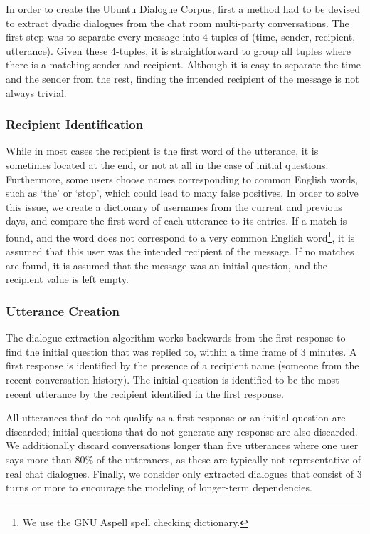 \documentclass[11pt,a4paper]{article}
\begin{document}
In order to create the Ubuntu Dialogue Corpus, first a method had to be devised to extract dyadic dialogues from the chat room multi-party conversations. The first step was to separate every message into 4-tuples of (time, sender, recipient, utterance). Given these 4-tuples, it is straightforward to group all tuples where there is a matching sender and recipient. Although it is easy to separate the time and the sender from the rest, finding the intended recipient of the message is not always trivial.


\subsubsection{Recipient Identification}

While in most cases the recipient is the first word of the utterance, it is sometimes located at the end, or not at all in the case of initial questions. Furthermore, some users choose names corresponding to common English words, such as `the' or `stop', which could lead to many false positives. In order to solve this issue, we create a dictionary of usernames from the current and previous days, and compare the first word of each utterance to its entries. If a match is found, and the word does not correspond to a very common English word\footnote{We use the GNU Aspell spell checking dictionary.}, it is assumed that this user was the intended recipient of the message. If no matches are found, it is assumed that the message was an initial question, and the recipient value is left empty.

\subsubsection{Utterance Creation}


The dialogue extraction algorithm works backwards from the first response to find the initial question that was replied to, within a time frame of 3 minutes. A first response is identified by the presence of a recipient name (someone from the recent conversation history).  The initial question is identified to be the most recent utterance by the recipient identified in the first response.

All utterances that do not qualify as a first response or an initial question are discarded; initial questions that do not generate any response are also discarded. We additionally discard conversations longer than five utterances where one user says more than 80\% of the utterances, as these are typically not representative of real chat dialogues. Finally, we consider only extracted dialogues that consist of 3 turns or more to encourage the modeling of longer-term dependencies. 
\end{document}
